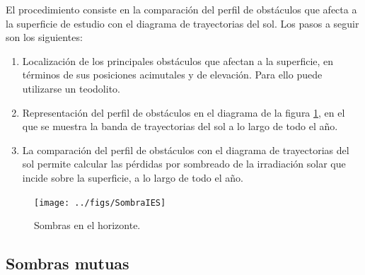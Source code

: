 El procedimiento consiste en la comparación del perfil de obstáculos
que afecta a la superficie de estudio con el diagrama de trayectorias
del sol. Los pasos a seguir son los siguientes:
\begin{enumerate}
\item Localización de los principales obstáculos que afectan a la
  superficie, en términos de sus posiciones acimutales y de
  elevación. Para ello puede utilizarse un teodolito.
\item Representación del perfil de obstáculos en el diagrama de la
  figura \ref{fig:DiagramaSombraLejana}, en el que se muestra la banda
  de trayectorias del sol a lo largo de todo el año.
\item La comparación del perfil de obstáculos con el diagrama de
  trayectorias del sol permite calcular las pérdidas por sombreado de
  la irradiación solar que incide sobre la superficie, a lo largo de
  todo el año. 
\end{enumerate}

\begin{figure}
\begin{centering}
\texttt{[image: ../figs/SombraIES]}
\end{centering}

\caption{Sombras en el horizonte.\label{fig:DiagramaSombraLejana}}

\end{figure}



\subsection{Sombras mutuas\label{sub:Sombras-mutuas}}

